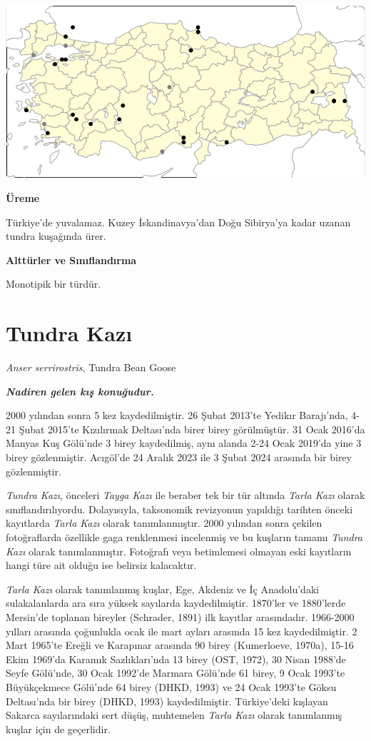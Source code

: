 \documentclass[
  a4paper,
  DIV=11,
  numbers=noendperiod]{scrreprt}
\begin{document}
\includegraphics[width=6.25in,height=\textheight]{images/harita_Anser_erythropus.png}

\textbf{Üreme}

Türkiye'de yuvalamaz. Kuzey İskandinavya'dan Doğu Sibirya'ya kadar
uzanan tundra kuşağında ürer.

\textbf{Alttürler ve Sınıflandırma}

Monotipik bir türdür.

\section{Tundra Kazı}\label{tundra-kazux131}

\emph{Anser serrirostris}, Tundra Bean Goose

\textbf{\emph{Nadiren gelen kış konuğudur.}}

2000 yılından sonra 5 kez kaydedilmiştir. 26 Şubat 2013'te Yedikır
Barajı'nda, 4-21 Şubat 2015'te Kızılırmak Deltası'nda birer birey
görülmüştür. 31 Ocak 2016'da Manyas Kuş Gölü'nde 3 birey kaydedilmiş,
aynı alanda 2-24 Ocak 2019'da yine 3 birey gözlenmiştir. Acıgöl'de 24
Aralık 2023 ile 3 Şubat 2024 arasında bir birey gözlenmiştir.

\emph{Tundra Kazı}, önceleri \emph{Tayga Kazı} ile beraber tek bir tür
altında \emph{Tarla Kazı} olarak sınıflandırılıyordu. Dolayısıyla,
taksonomik revizyonun yapıldığı tarihten önceki kayıtlarda \emph{Tarla
Kazı} olarak tanımlanmıştır. 2000 yılından sonra çekilen fotoğraflarda
özellikle gaga renklenmesi incelenmiş ve bu kuşların tamamı \emph{Tundra
Kazı} olarak tanımlanmıştır. Fotoğrafı veya betimlemesi olmayan eski
kayıtların hangi türe ait olduğu ise belirsiz kalacaktır.

\emph{Tarla Kazı} olarak tanımlanmış kuşlar, Ege, Akdeniz ve İç
Anadolu'daki sulakalanlarda ara sıra yüksek sayılarda kaydedilmiştir.
1870'ler ve 1880'lerde Mersin'de toplanan bireyler (Schrader, 1891) ilk
kayıtlar arasındadır. 1966-2000 yılları arasında çoğunlukla ocak ile
mart ayları arasında 15 kez kaydedilmiştir. 2 Mart 1965'te Ereğli ve
Karapınar arasında 90 birey (Kumerloeve, 1970a), 15-16 Ekim 1969'da
Karamık Sazlıkları'nda 13 birey (OST, 1972), 30 Nisan 1988'de Seyfe
Gölü'nde, 30 Ocak 1992'de Marmara Gölü'nde 61 birey, 9 Ocak 1993'te
Büyükçekmece Gölü'nde 64 birey (DHKD, 1993) ve 24 Ocak 1993'te Göksu
Deltası'nda bir birey (DHKD, 1993) kaydedilmiştir. Türkiye'deki kışlayan
Sakarca sayılarındaki sert düşüş, muhtemelen \emph{Tarla Kazı} olarak
tanımlanmış kuşlar için de geçerlidir.
\end{document}
